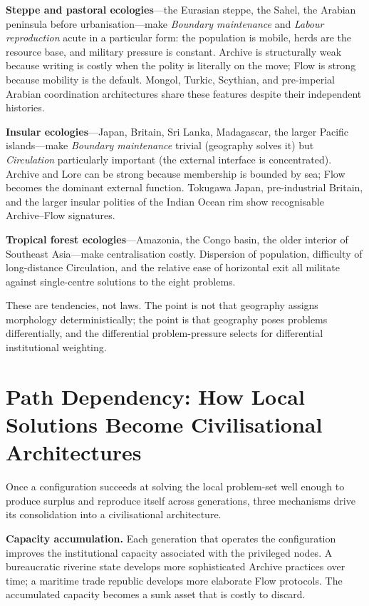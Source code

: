 \documentclass[12pt,a4paper]{article}
\begin{document}
\textbf{Steppe and pastoral ecologies}---the Eurasian steppe, the Sahel, the Arabian peninsula before urbanisation---make \textit{Boundary maintenance} and \textit{Labour reproduction} acute in a particular form: the population is mobile, herds are the resource base, and military pressure is constant. Archive is structurally weak because writing is costly when the polity is literally on the move; Flow is strong because mobility is the default. Mongol, Turkic, Scythian, and pre-imperial Arabian coordination architectures share these features despite their independent histories.

\textbf{Insular ecologies}---Japan, Britain, Sri Lanka, Madagascar, the larger Pacific islands---make \textit{Boundary maintenance} trivial (geography solves it) but \textit{Circulation} particularly important (the external interface is concentrated). Archive and Lore can be strong because membership is bounded by sea; Flow becomes the dominant external function. Tokugawa Japan, pre-industrial Britain, and the larger insular polities of the Indian Ocean rim show recognisable Archive--Flow signatures.

\textbf{Tropical forest ecologies}---Amazonia, the Congo basin, the older interior of Southeast Asia---make centralisation costly. Dispersion of population, difficulty of long-distance Circulation, and the relative ease of horizontal exit all militate against single-centre solutions to the eight problems.

These are tendencies, not laws. The point is not that geography assigns morphology deterministically; the point is that geography poses problems differentially, and the differential problem-pressure selects for differential institutional weighting.

\section{Path Dependency: How Local Solutions Become Civilisational Architectures}

Once a configuration succeeds at solving the local problem-set well enough to produce surplus and reproduce itself across generations, three mechanisms drive its consolidation into a civilisational architecture.

\textbf{Capacity accumulation.} Each generation that operates the configuration improves the institutional capacity associated with the privileged nodes. A bureaucratic riverine state develops more sophisticated Archive practices over time; a maritime trade republic develops more elaborate Flow protocols. The accumulated capacity becomes a sunk asset that is costly to discard.
\end{document}

